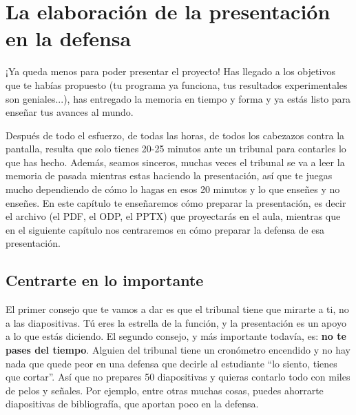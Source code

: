 \chapter{La elaboración de la presentación en la defensa} \label{cap:elaboraciónPresentación}


¡Ya queda menos para poder presentar el proyecto! Has llegado a los objetivos que te habías propuesto (tu programa ya funciona, tus resultados experimentales son geniales...), has entregado la memoria en tiempo y forma y ya estás listo para enseñar tus avances al mundo.

Después de todo el esfuerzo, de todas las horas, de todos los cabezazos contra la pantalla, resulta que solo tienes 20-25 minutos ante un tribunal para contarles lo que has hecho. Además, seamos sinceros, muchas veces el tribunal se va a leer la memoria de pasada mientras estas haciendo la presentación, así que te juegas mucho dependiendo de cómo lo hagas en esos 20 minutos y lo que enseñes y no enseñes. En este capítulo te enseñaremos cómo preparar la presentación, es decir el archivo (el PDF, el ODP, el PPTX) que proyectarás en el aula, mientras que en el siguiente capítulo nos centraremos en cómo preparar la defensa de esa presentación.

\section{Centrarte en lo importante}

El primer consejo que te vamos a dar es que el tribunal tiene que mirarte a ti, no a las diapositivas. Tú eres la estrella de la función, y la presentación es un apoyo a lo que estás diciendo. El segundo consejo, y más importante todavía, es: \textbf{no te pases del tiempo}. Alguien del tribunal tiene un cronómetro encendido y no hay nada que quede peor en una defensa que decirle al estudiante ``lo siento, tienes que cortar''. Así que no prepares 50 diapositivas y quieras contarlo todo con miles de pelos y señales. Por ejemplo, entre otras muchas cosas, puedes ahorrarte diapositivas de bibliografía, que aportan poco en la defensa.

